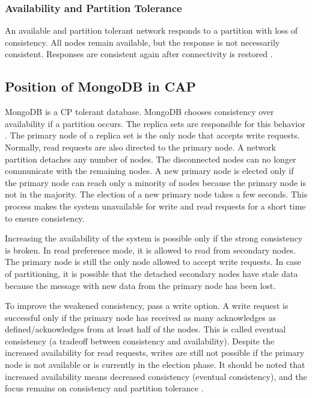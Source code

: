 \subsubsection*{Availability and Partition Tolerance}

An available and partition tolerant network responds to a partition with loss of consistency. All nodes remain available, but the response is not necessarily consistent. Responses are consistent again after connectivity is restored \parencite[6]{brewer:2002}.

\subsection*{Position of MongoDB in CAP}

MongoDB is a \ac{CP} tolerant database. MongoDB chooses consistency over availability if a partition occurs. The replica sets are responsible for this behavior \parencite{stackoverflow:2023}.
The primary node of a replica set is the only node that accepts write requests. Normally, read requests are also directed to the primary node. A network partition detaches any number of nodes. The disconnected nodes can no longer communicate with the remaining nodes. A new primary node is elected only if the primary node can reach only a minority of nodes because the primary node is not in the majority. The election of a new primary node takes a few seconds. This process makes the system unavailable for write and read requests for a short time to ensure consistency.

Increasing the availability of the system is possible only if the strong consistency is broken. In read preference mode, it is allowed to read from secondary nodes. The primary node is still the only node allowed to accept write requests. In case of partitioning, it is possible that the detached secondary nodes have stale data because the message with new data from the primary node has been lost.

To improve the weakened consistency, pass a write option. A write request is successful only if the primary node has received as many acknowledges as defined/acknowledges from at least half of the nodes. This is called eventual consistency (a tradeoff between consistency and availability). Despite the increased availability for read requests, writes are still not possible if the primary node is not available or is currently in the election phase. It should be noted that increased availability means decreased consistency (eventual consistency), and the focus remains on consistency and partition tolerance \parencite{katwal:2020}.